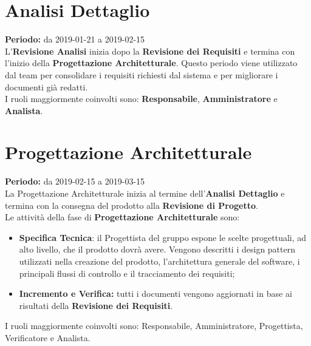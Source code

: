 \section{Analisi Dettaglio}
\textbf{Periodo:} da 2019-01-21 a 2019-02-15\\
L'\textbf{Revisione Analisi} inizia dopo la \textbf{Revisione dei Requisiti} e termina con l’inizio della \textbf{Progettazione Architetturale}. Questo periodo viene utilizzato dal team per consolidare i requisiti richiesti dal sistema e per migliorare i documenti già redatti.\\I ruoli maggiormente coinvolti sono: \textbf{Responsabile}, \textbf{Amministratore} e \textbf{Analista}.

\section{Progettazione Architetturale}
\textbf{Periodo:} da 2019-02-15 a 2019-03-15\\
La Progettazione Architetturale inizia al termine dell’\textbf{Analisi Dettaglio} e termina con la consegna del prodotto alla \textbf{Revisione di Progetto}.\\
Le attività della fase di \textbf{Progettazione Architetturale} sono:
\begin{itemize}
    \item \textbf{Specifica Tecnica}: il Progettista del gruppo espone le scelte progettuali, ad alto livello, che il prodotto dovrà avere. Vengono descritti i design pattern utilizzati nella creazione del prodotto, l’architettura generale del software, i principali flussi di controllo e il tracciamento dei requisiti;
    \item \textbf{Incremento e Verifica:} tutti i documenti vengono aggiornati in base ai risultati della \textbf{Revisione dei Requisiti}.
\end{itemize}
I ruoli maggiormente coinvolti sono: Responsabile, Amministratore, Progettista, Verificatore e Analista.

